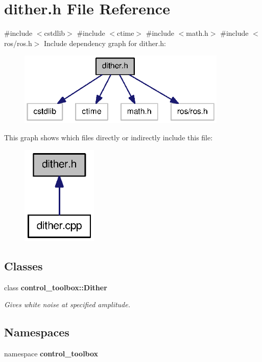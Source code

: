 \section{dither.\-h \-File \-Reference}
\label{dither_8h}
{\ttfamily \#include $<$cstdlib$>$}\*
{\ttfamily \#include $<$ctime$>$}\*
{\ttfamily \#include $<$math.\-h$>$}\*
{\ttfamily \#include $<$ros/ros.\-h$>$}\*
\-Include dependency graph for dither.\-h\-:
\nopagebreak
\begin{figure}[H]
\begin{center}
\leavevmode
\includegraphics[width=282pt]{dither_8h__incl}
\end{center}
\end{figure}
\-This graph shows which files directly or indirectly include this file\-:
\nopagebreak
\begin{figure}[H]
\begin{center}
\leavevmode
\includegraphics[width=102pt]{dither_8h__dep__incl}
\end{center}
\end{figure}
\subsection*{\-Classes}
\begin{DoxyCompactItemize}
\item 
class {\bf control\-\_\-toolbox\-::\-Dither}
\begin{DoxyCompactList}\small\item\em \-Gives white noise at specified amplitude. \end{DoxyCompactList}\end{DoxyCompactItemize}
\subsection*{\-Namespaces}
\begin{DoxyCompactItemize}
\item 
namespace {\bf control\-\_\-toolbox}
\end{DoxyCompactItemize}
